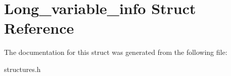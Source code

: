\hypertarget{structLong__variable__info}{}\section{Long\+\_\+variable\+\_\+info Struct Reference}
\label{structLong__variable__info}


The documentation for this struct was generated from the following file\+:\begin{DoxyCompactItemize}
\item 
structures.\+h\end{DoxyCompactItemize}
